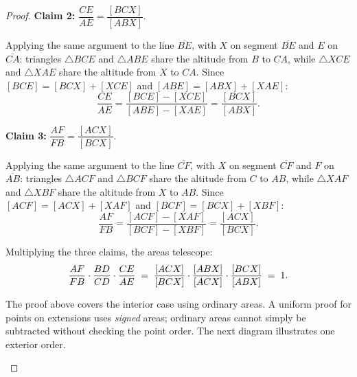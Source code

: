 \documentclass[reqno]{amsart}
\DeclareMathOperator{\1}{\textbf{1}}
\begin{document}
\begin{proof}
\textbf{Claim 2:} $\dfrac{CE}{AE} = \dfrac{[BCX]}{[ABX]}$.

Applying the same argument to the line $\overline{BE}$, with $X$ on segment $\overline{BE}$ and $E$ on $\overline{CA}$: triangles $\triangle BCE$ and $\triangle ABE$ share the altitude from $B$ to $CA$, while $\triangle XCE$ and $\triangle XAE$ share the altitude from $X$ to $CA$. Since $[BCE] = [BCX] + [XCE]$ and $[ABE] = [ABX] + [XAE]$:
\[
    \frac{CE}{AE} = \frac{[BCE] - [XCE]}{[ABE] - [XAE]} = \frac{[BCX]}{[ABX]}.
\]

\textbf{Claim 3:} $\dfrac{AF}{FB} = \dfrac{[ACX]}{[BCX]}$.

Applying the same argument to the line $\overline{CF}$, with $X$ on segment $\overline{CF}$ and $F$ on $\overline{AB}$: triangles $\triangle ACF$ and $\triangle BCF$ share the altitude from $C$ to $AB$, while $\triangle XAF$ and $\triangle XBF$ share the altitude from $X$ to $AB$. Since $[ACF] = [ACX] + [XAF]$ and $[BCF] = [BCX] + [XBF]$:
\[
    \frac{AF}{FB} = \frac{[ACF] - [XAF]}{[BCF] - [XBF]} = \frac{[ACX]}{[BCX]}.
\]

Multiplying the three claims, the areas telescope:
\[
    \frac{AF}{FB}\cdot\frac{BD}{CD}\cdot\frac{CE}{AE}
    \;=\; \frac{[ACX]}{[BCX]}\cdot\frac{[ABX]}{[ACX]}\cdot\frac{[BCX]}{[ABX]} \;=\; 1.\qedhere
\]

The proof above covers the interior case using ordinary areas.  A uniform proof
for points on extensions uses \emph{signed} areas; ordinary areas cannot simply
be subtracted without checking the point order.  The next diagram illustrates
one exterior order.

\begin{center}
\end{center}
\end{proof}
\end{document}
